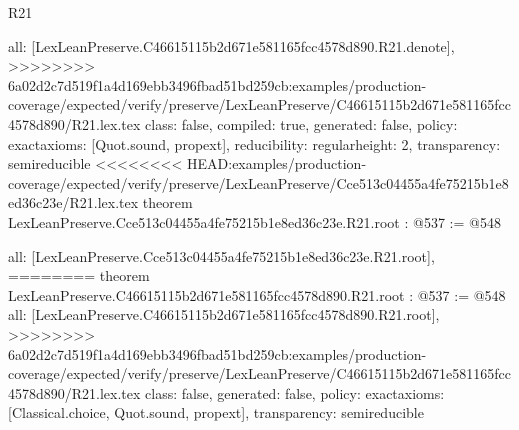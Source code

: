 \begin{lexlean}{R21}
\begin{coremodule}
{{{{{  all: [LexLeanPreserve.C46615115b2d671e581165fcc4578d890.R21.denote],
>>>>>>>> 6a02d2c7d519f1a4d169ebb3496fbad51bd259cb:examples/production-coverage/expected/verify/preserve/LexLeanPreserve/C46615115b2d671e581165fcc4578d890/R21.lex.tex
  class: false,
  compiled: true,
  generated: false,
  policy: exact{axioms: [Quot.sound, propext]},
  reducibility: regular{height: 2},
  transparency: semireducible
}
<<<<<<<< HEAD:examples/production-coverage/expected/verify/preserve/LexLeanPreserve/Cce513c04455a4fe75215b1e8ed36c23e/R21.lex.tex
theorem LexLeanPreserve.Cce513c04455a4fe75215b1e8ed36c23e.R21.root : @537 := @548 {
  all: [LexLeanPreserve.Cce513c04455a4fe75215b1e8ed36c23e.R21.root],
========
theorem LexLeanPreserve.C46615115b2d671e581165fcc4578d890.R21.root : @537 := @548 {
  all: [LexLeanPreserve.C46615115b2d671e581165fcc4578d890.R21.root],
>>>>>>>> 6a02d2c7d519f1a4d169ebb3496fbad51bd259cb:examples/production-coverage/expected/verify/preserve/LexLeanPreserve/C46615115b2d671e581165fcc4578d890/R21.lex.tex
  class: false,
  generated: false,
  policy: exact{axioms: [Classical.choice, Quot.sound, propext]},
  transparency: semireducible
}

}}}}}
\end{coremodule}
\end{lexlean}
